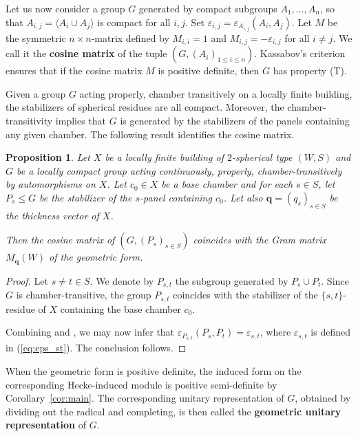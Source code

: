 \documentclass[12pt,a4paper]{amsproc}
\newtheorem{proposition}[theorem]{Proposition}
\theoremstyle{definition}
\newcommand{\qq}{\mathbf q}
\begin{document}
Let us now consider a group $G$ generated by compact subgroups $A_1, \dots, A_n$, so that $A_{i, j} = \langle A_i \cup A_j \rangle$ is compact for all $i, j$. Set $\varepsilon_{i, j} = \varepsilon_{A_{i, j}}(A_i, A_j)$. Let $M$ be the symmetric $n\times n$-matrix defined by $M_{i, i} = 1$ and $M_{i, j}= -\varepsilon_{i, j}$  for all $i \neq j$. We call it the \textbf{cosine matrix} of the tuple $(G, (A_i)_{1\leq i \leq n})$. Kassabov's criterion \cite[\S2]{Ka11} ensures that if the cosine matrix $M$ is positive definite, then $G$ has property (T). 

Given a group  $G$ acting properly, chamber transitively on a locally finite building, the stabilizers of spherical residues are all compact. Moreover, the chamber-transitivity implies that $G$ is generated by the stabilizers of the panels containing any given chamber. The following result identifies the cosine matrix. 

\begin{proposition}\label{prop:cosine-matrix}
Let $X$ be a locally finite building of $2$-spherical type $(W, S)$ and $G$ be a locally compact group acting continuously, properly, chamber-transitively by  automorphisms on $X$. Let $c_0 \in X$ be a base chamber and for each $s\in S$, let $P_s \leq G$ be the stabilizer of the $s$-panel containing $c_0$. Let also $\qq=(q_s)_{s\in S}$ be the thickness vector of $X$. 

Then the cosine matrix of $(G, (P_s)_{s \in S})$ coincides with the Gram matrix $M_\qq(W)$ of the geometric form. 
\end{proposition}
\begin{proof}
Let $s \neq t \in S$. We denote by $P_{s, t}$ the subgroup generated by $P_s \cup P_t$. Since $G$ is chamber-transitive, the group $P_{s, t}$ coincides with the stabilizer of the $\{s, t\}$-residue of $X$ containing the base chamber $c_0$. 

Combining \cite[Proposition~7.1]{Garland} and \cite[Theorem~2.10(ii)]{CKKW}, we may now infer that   $\varepsilon_{P_{s, t}}(P_s, P_t) = \varepsilon_{s, t}$, where $\varepsilon_{s, t}$ is defined in (\ref{eq:eps_st}). The conclusion follows. 
\end{proof}

When the geometric form is positive definite, the induced form on the corresponding Hecke-induced module is positive semi-definite by Corollary~\ref{cor:main}. The corresponding unitary representation of $G$, obtained by dividing out the radical and completing, is then called the \textbf{geometric unitary representation} of $G$. 
 
\end{document}
